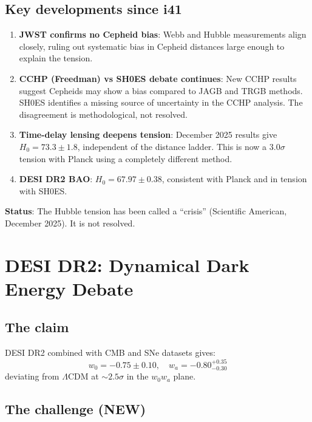 \documentclass[11pt,a4paper]{article}
\begin{document}
\subsection{Key developments since i41}

\begin{enumerate}
\item \textbf{JWST confirms no Cepheid bias}: Webb and Hubble measurements align closely, ruling out systematic bias in Cepheid distances large enough to explain the tension.

\item \textbf{CCHP (Freedman) vs SH0ES debate continues}: New CCHP results suggest Cepheids may show a bias compared to JAGB and TRGB methods. SH0ES identifies a missing source of uncertainty in the CCHP analysis. The disagreement is methodological, not resolved.

\item \textbf{Time-delay lensing deepens tension}: December 2025 results give $H_0 = 73.3 \pm 1.8$, independent of the distance ladder. This is now a $3.0\sigma$ tension with Planck using a completely different method.

\item \textbf{DESI DR2 BAO}: $H_0 = 67.97 \pm 0.38$, consistent with Planck and in tension with SH0ES.
\end{enumerate}

\textbf{Status}: The Hubble tension has been called a ``crisis'' (Scientific American, December 2025). It is not resolved.

\section{DESI DR2: Dynamical Dark Energy Debate}

\subsection{The claim}

DESI DR2 combined with CMB and SNe datasets gives:
\begin{equation}
w_0 = -0.75 \pm 0.10, \quad w_a = -0.80^{+0.35}_{-0.30}
\end{equation}
deviating from $\Lambda$CDM at $\sim 2.5\sigma$ in the $w_0 w_a$ plane.

\subsection{The challenge (NEW)}
\end{document}
